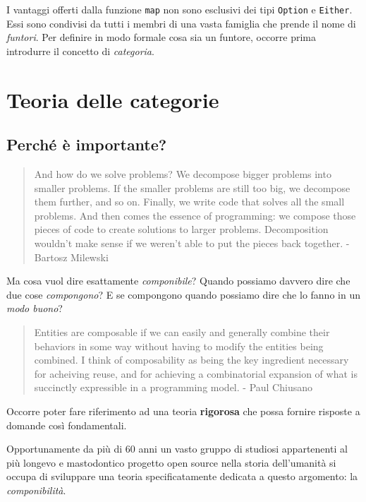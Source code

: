 \documentclass[12pt]{article}
\theoremstyle{definition}
\begin{document}
I vantaggi offerti dalla funzione \texttt{map} non sono esclusivi dei tipi \texttt{Option} e \texttt{Either}.
Essi sono condivisi da tutti i membri di una vasta famiglia che prende il nome di \emph{funtori}. Per definire in modo formale cosa sia un funtore,
occorre prima introdurre il concetto di \emph{categoria}.

\section{Teoria delle categorie}

\subsection{Perché è importante?}

\begin{quote}
And how do we solve problems? We decompose bigger problems into smaller problems. If the smaller problems are still too big,
we decompose them further, and so on. Finally, we write code that solves all the small problems.
And then comes the essence of programming: we compose those pieces of code to create solutions to larger problems.
Decomposition wouldn’t make sense if we weren’t able to put the pieces back together. - Bartosz Milewski
\end{quote}

Ma cosa vuol dire esattamente \emph{componibile}? Quando possiamo davvero dire che due cose \emph{compongono}?
E se compongono quando possiamo dire che lo fanno in un \emph{modo buono}?\\

\begin{quote}
Entities are composable if we can easily and generally combine their behaviors in some way without having to modify the entities being combined.
I think of composability as being the key ingredient necessary for acheiving reuse, and for achieving a combinatorial expansion of
what is succinctly expressible in a programming model. - Paul Chiusano
\end{quote}

Occorre poter fare riferimento ad una teoria \textbf{rigorosa} che possa fornire risposte a domande così fondamentali.

Opportunamente da più di 60 anni un vasto gruppo di studiosi appartenenti al più longevo e mastodontico progetto open source nella storia
dell'umanità si occupa di sviluppare una teoria specificatamente dedicata a questo argomento: la \emph{componibilità}.
\end{document}
